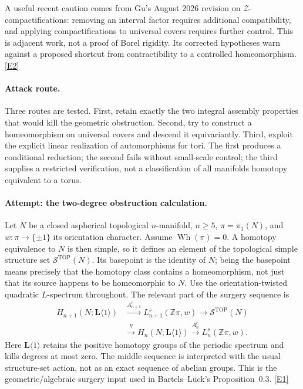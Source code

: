 \documentclass[11pt,a4paper]{article}
\newcommand{\Z}{\mathbb{Z}}
\newcommand{\eref}[2]{\hyperlink{extra:#1:#2}{[E#2]}}
\numberwithin{equation}{section}
\begin{document}
A useful recent caution comes from Gu's August 2026 revision on
$\mathcal Z$-compactifications: removing an interval factor requires
additional compatibility, and applying compactifications to universal
covers requires further control. This is adjacent work, not a proof of
Borel rigidity. Its corrected hypotheses warn against a proposed shortcut
from contractibility to a controlled homeomorphism. \eref{30006734}{2}

\paragraph{Attack route.}
Three routes are tested. First, retain exactly the two integral assembly
properties that would kill the geometric obstruction. Second, try to
construct a homeomorphism on universal covers and descend it equivariantly.
Third, exploit the explicit linear realization of automorphisms for tori.
The first produces a conditional reduction; the second fails without
small-scale control; the third supplies a restricted verification, not a
classification of all manifolds homotopy equivalent to a torus.

\paragraph{Attempt: the two-degree obstruction calculation.}
Let $N$ be a closed aspherical topological $n$-manifold, $n\geq5$,
$\pi=\pi_1(N)$, and $w:\pi\to\{\pm1\}$ its orientation character.
Assume $\operatorname{Wh}(\pi)=0$. A homotopy equivalence to $N$ is then
simple, so it defines an element of the topological simple structure set
$\mathcal S^{\mathrm{TOP}}(N)$. Its basepoint is the identity of $N$;
being the basepoint means precisely that the homotopy class contains a
homeomorphism, not just that its source happens to be homeomorphic to $N$.
Use the orientation-twisted quadratic $L$-spectrum throughout.
The relevant part of the surgery sequence is
\begin{equation}\label{eq:30006734:surgery}
\begin{split}
 H_{n+1}(N;\mathbf L\langle1\rangle)&\xrightarrow{A^c_{n+1}}
 L^s_{n+1}(\Z\pi,w)\longrightarrow\mathcal S^{\mathrm{TOP}}(N)\\
 &\xrightarrow{\eta}H_n(N;\mathbf L\langle1\rangle)
 \xrightarrow{A^c_n}L^s_n(\Z\pi,w).
\end{split}
\end{equation}
Here $\mathbf L\langle1\rangle$ retains the positive homotopy groups
of the periodic spectrum and kills degrees at most zero. The middle
sequence is interpreted with the usual structure-set action, not as an
exact sequence of abelian groups. This is the geometric/algebraic surgery
input used in Bartels--L\"uck's Proposition~0.3. \eref{30006734}{1}
\end{document}

